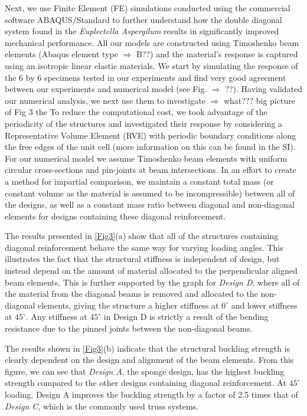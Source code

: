 \documentclass[9pt,twocolumn,twoside]{fernandes_paper}
\newcommand{\KB}[1]{\noindent\color{blue}$\Longrightarrow$ #1\normalcolor}
\begin{document}
Next, we use Finite Element (FE) simulations conducted using the commercial software ABAQUS/Standard to further understand how the double diagonal system found in the \textit{Euplectella Aspergilum} results in significantly improved mechanical performance.  All our models are constructed using  Timoshenko beam elements (Abaqus element type \KB{B??}) and the material's response is captured using an isotropic linear elastic materials. We start by simulating the response of the  6 by 6 specimens tested in our experiments and find  very good agreement  between our experiments and numerical model (see Fig. \KB{??}).  Having validated our numerical analysis, we next use them to investigate \KB{what??? big picture of Fig 3} the To reduce the computational cost, we took advantage of the periodicity of the structures and investigated their response  by considering a Representative Volume Element (RVE) with periodic boundary conditions along the free edges of the unit cell (more information on this can be found in the SI). For our numerical model we assume Timoshenko beam elements with uniform circular cross-sections and pin-joints at beam intersections. In an effort to create a method for impartial comparison, we maintain a constant total mass (or constant volume as the material is assumed to be incompressible) between all of the designs, as well as a constant mass ratio between diagonal and non-diagonal elements for designs containing these diagonal reinforcement. 

The results presented in \cref{Fig3}(a) show that all of the structures containing diagonal reinforcement behave the same way for varying loading angles. This illustrates the fact that the structural stiffness is independent of design, but instead depend on the amount of material allocated to the perpendicular aligned beam elements. This is further supported by the graph for \emph{Design D}, where all of the material from the diagonal beams is removed and allocated to the non-diagonal elements, giving the structure a higher stiffness at $0^\circ$ and lower stiffness at $45^\circ$. Any stiffness at $45^\circ$ in Design D is strictly a result of the bending resistance due to the pinned joints between the non-diagonal beams.

The results shown in \cref{Fig3}(b) indicate that the structural buckling strength is clearly dependent on the design and alignment of the beam elements. From this figure, we can see that \emph{Design A}, the sponge design, has the highest buckling strength compared to the other designs containing diagonal reinforcement. At $45^\circ$ loading, Design A improves the buckling strength by a factor of 2.5 times that of \emph{Design C}, which is the commonly used truss systems. 
\end{document}
